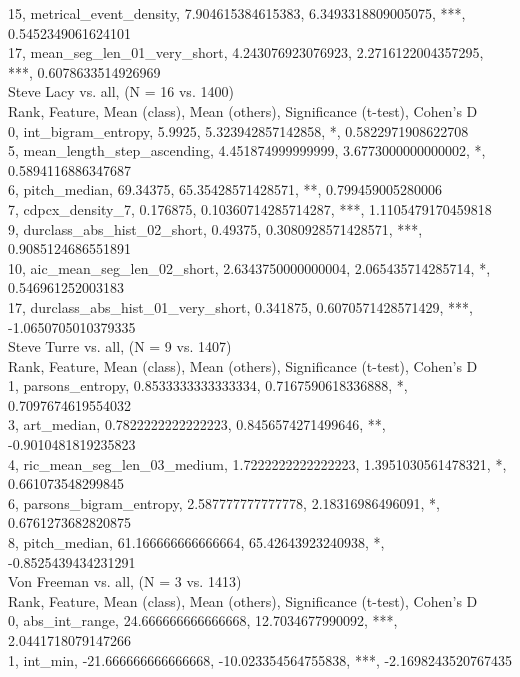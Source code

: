 15, metrical_event_density, 7.904615384615383, 6.3493318809005075, ***, 0.5452349061624101\\
17, mean_seg_len_01_very_short, 4.243076923076923, 2.2716122004357295, ***, 0.6078633514926969\\
Steve Lacy vs. all, (N = 16 vs. 1400)\\
Rank, Feature, Mean (class), Mean (others), Significance (t-test), Cohen's D\\
0, int_bigram_entropy, 5.9925, 5.323942857142858, *, 0.5822971908622708\\
5, mean_length_step_ascending, 4.451874999999999, 3.6773000000000002, *, 0.5894116886347687\\
6, pitch_median, 69.34375, 65.35428571428571, **, 0.799459005280006\\
7, cdpcx_density_7, 0.176875, 0.10360714285714287, ***, 1.1105479170459818\\
9, durclass_abs_hist_02_short, 0.49375, 0.3080928571428571, ***, 0.9085124686551891\\
10, aic_mean_seg_len_02_short, 2.6343750000000004, 2.065435714285714, *, 0.546961252003183\\
17, durclass_abs_hist_01_very_short, 0.341875, 0.6070571428571429, ***, -1.0650705010379335\\
Steve Turre vs. all, (N = 9 vs. 1407)\\
Rank, Feature, Mean (class), Mean (others), Significance (t-test), Cohen's D\\
1, parsons_entropy, 0.8533333333333334, 0.7167590618336888, *, 0.7097674619554032\\
3, art_median, 0.7822222222222223, 0.8456574271499646, **, -0.9010481819235823\\
4, ric_mean_seg_len_03_medium, 1.7222222222222223, 1.3951030561478321, *, 0.661073548299845\\
6, parsons_bigram_entropy, 2.587777777777778, 2.18316986496091, *, 0.6761273682820875\\
8, pitch_median, 61.166666666666664, 65.42643923240938, *, -0.8525439434231291\\
Von Freeman vs. all, (N = 3 vs. 1413)\\
Rank, Feature, Mean (class), Mean (others), Significance (t-test), Cohen's D\\
0, abs_int_range, 24.666666666666668, 12.7034677990092, ***, 2.0441718079147266\\
1, int_min, -21.666666666666668, -10.023354564755838, ***, -2.1698243520767435\\

